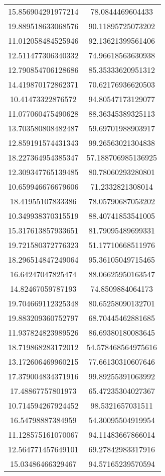 \begin{table}
\begin{tabular}{cc}
15.856904291977214 & 78.0844469604433 \\
19.889518633068576 & 90.11895725073202 \\
11.012058484525946 & 92.13621399561406 \\
12.511477306340332 & 74.96618563630938 \\
12.790854706128686 & 85.35333620951312 \\
14.419870172862371 & 70.62176936620503 \\
10.41473322876572 & 94.80547173129077 \\
11.077060475490628 & 88.36345389325113 \\
13.703580808482487 & 59.69701988903917 \\
12.859191574431343 & 99.26563021304838 \\
18.227364954385347 & 57.188706985136925 \\
12.309347765139485 & 80.78060293280801 \\
10.659946676679606 & 71.2332821308014 \\
18.41955107833386 & 78.05790687053202 \\
10.349938370315519 & 88.40741853541005 \\
15.317613857933651 & 81.79095489699331 \\
19.721580372776323 & 51.17710668511976 \\
18.296514847249064 & 95.36105049715465 \\
16.64247047825474 & 88.06625950163547 \\
14.82467059787193 & 74.8509884064173 \\
19.704669112325348 & 80.65258090132701 \\
19.883209360752797 & 68.70445462881685 \\
11.937824823989526 & 86.69380180083645 \\
18.719868283172012 & 54.578468564975616 \\
13.172606469960215 & 77.66130310607646 \\
17.379004834371916 & 99.89255391063992 \\
17.48867757801973 & 65.47235304027367 \\
10.714594267924452 & 98.5321657031511 \\
16.54798887384959 & 54.30095504919954 \\
11.128575161070067 & 94.11483667866014 \\
12.564771457649101 & 69.27842983317916 \\
15.03486466329467 & 94.57165239570594 \\

\end{tabular}
\end{table}
